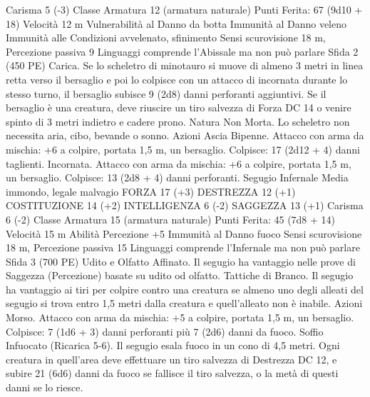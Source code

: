 \begin{multicols}{2}
Carisma 5 (-3)
Classe Armatura 12 (armatura naturale)
\hspace*{0pt}\hfill{Punti Ferita}: 67 (9d10 + 18)
Velocità 12 m
Vulnerabilità al Danno da botta
Immunità al Danno veleno
Immunità alle Condizioni avvelenato, sfinimento
Sensi scurovisione 18 m, Percezione passiva 9
Linguaggi comprende l’Abissale ma non può parlare
Sfida 2 (450 PE)
Carica. Se lo scheletro di minotauro si muove di almeno 3 metri
in linea retta verso il bersaglio e poi lo colpisce con un attacco di
incornata durante lo stesso turno, il bersaglio subisce 9 (2d8)
danni perforanti aggiuntivi. Se il bersaglio è una creatura, deve
riuscire un tiro salvezza di Forza DC 14 o venire spinto di 3
metri indietro e cadere prono.
Natura Non Morta. Lo scheletro non necessita aria, cibo,
bevande o sonno.
Azioni
Ascia Bipenne. Attacco con arma da mischia: +6 a colpire,
portata 1,5 m, un bersaglio.
Colpisce: 17 (2d12 + 4) danni taglienti.
Incornata. Attacco con arma da mischia: +6 a colpire, portata
1,5 m, un bersaglio.
Colpisce: 13 (2d8 + 4) danni perforanti.
Segugio Infernale
Media immondo, legale malvagio
FORZA 17 (+3)
DESTREZZA 12 (+1)
COSTITUZIONE 14 (+2)
INTELLIGENZA 6 (-2)
SAGGEZZA 13 (+1)
Carisma 6 (-2)
Classe Armatura 15 (armatura naturale)
\hspace*{0pt}\hfill{Punti Ferita}: 45 (7d8 + 14)
Velocità 15 m
Abilità Percezione +5
Immunità al Danno fuoco
Sensi scurovisione 18 m, Percezione passiva 15
Linguaggi comprende l’Infernale ma non può parlare
Sfida 3 (700 PE)
Udito e Olfatto Affinato. Il segugio ha vantaggio nelle prove di
Saggezza (Percezione) basate su udito od olfatto.
Tattiche di Branco. Il segugio ha vantaggio ai tiri per colpire
contro una creatura se almeno uno degli alleati del segugio si
trova entro 1,5 metri dalla creatura e quell’alleato non è inabile.
Azioni
Morso. Attacco con arma da mischia: +5 a colpire, portata 1,5
m, un bersaglio.
Colpisce: 7 (1d6 + 3) danni perforanti più 7 (2d6) danni da
fuoco.
Soffio Infuocato (Ricarica 5-6). Il segugio esala fuoco in un
cono di 4,5 metri. Ogni creatura in quell’area deve effettuare un
tiro salvezza di Destrezza DC 12, e subire 21 (6d6) danni da
fuoco se fallisce il tiro salvezza, o la metà di questi danni se lo
riesce.
 

\end{multicols}
